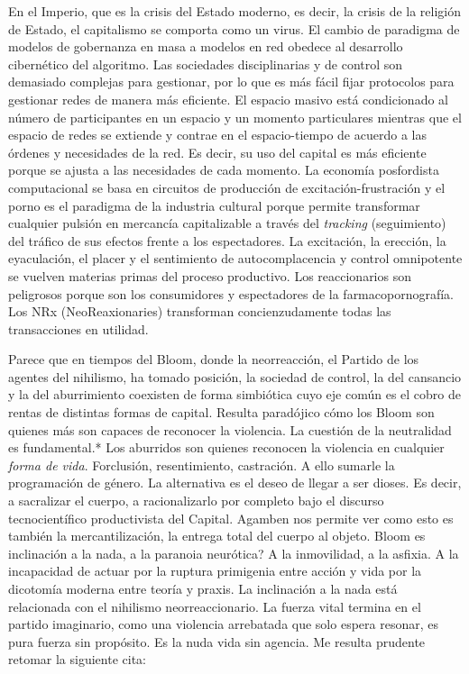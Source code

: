 En el Imperio, que es la crisis del Estado moderno, es decir, la crisis de la religión de Estado, el capitalismo se comporta como un virus. El cambio de paradigma de modelos de gobernanza en masa a modelos en red obedece al desarrollo cibernético del algoritmo. Las sociedades disciplinarias y de control son demasiado complejas para gestionar, por lo que es más fácil fijar protocolos para gestionar redes de manera más eficiente. El espacio masivo está condicionado al número de participantes en un espacio y un momento particulares mientras que el espacio de redes se extiende y contrae en el espacio-tiempo de acuerdo a las órdenes y necesidades de la red. Es decir, su uso del capital es más eficiente porque se ajusta a las necesidades de cada momento. La economía posfordista computacional se basa en circuitos de producción de excitación-frustración y el porno es el paradigma de la industria cultural porque permite transformar cualquier pulsión en mercancía capitalizable a través del \emph{tracking} (seguimiento) del tráfico de sus efectos frente a los espectadores. La excitación, la erección, la eyaculación, el placer y el sentimiento de autocomplacencia y control omnipotente se vuelven materias primas del proceso productivo. Los reaccionarios son peligrosos porque son los consumidores y espectadores de la farmacopornografía. Los NRx (NeoReaxionaries) transforman concienzudamente todas las transacciones en utilidad.

Parece que en tiempos del Bloom, donde la neorreacción, el Partido de los agentes del nihilismo, ha tomado posición, la sociedad de control, la del cansancio y la del aburrimiento \autocite{orozcogaribaySociedadCansancioSociedad2015} coexisten de forma simbiótica cuyo eje común es el cobro de rentas de distintas formas de capital. Resulta paradójico cómo los Bloom son quienes más son capaces de reconocer la violencia. La cuestión de la neutralidad es fundamental.* Los aburridos son quienes reconocen la violencia en cualquier \emph{forma de vida}. Forclusión, resentimiento, castración. A ello sumarle la programación de género. La alternativa es el deseo de llegar a ser dioses. Es decir, a sacralizar el cuerpo, a racionalizarlo por completo bajo el discurso tecnocientífico productivista del Capital. Agamben nos permite ver como esto es también la mercantilización, la entrega total del cuerpo al objeto. Bloom es inclinación a la nada, a la paranoia neurótica? A la inmovilidad, a la asfixia. A la incapacidad de actuar por la ruptura primigenia entre acción y vida por la dicotomía moderna entre teoría y praxis. La inclinación a la nada está relacionada con el nihilismo neorreaccionario. La fuerza vital termina en el partido imaginario, como una violencia arrebatada que solo espera resonar, es pura fuerza sin propósito. Es la nuda vida sin agencia. Me resulta prudente retomar la siguiente cita:


